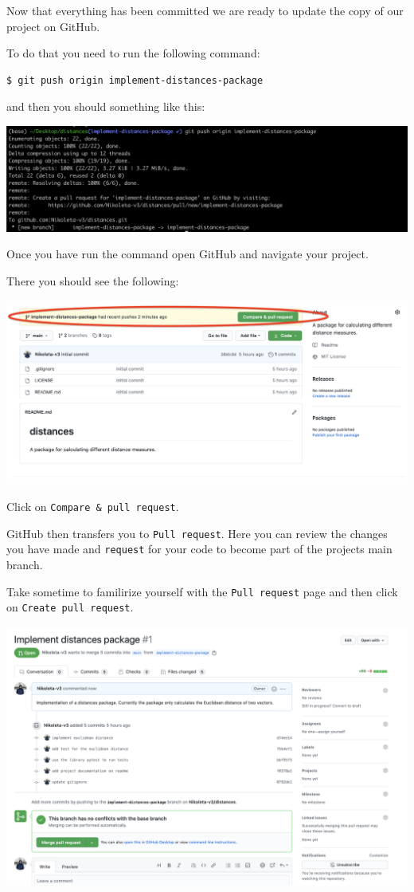 \documentclass[11pt]{article}
\begin{document}
    Now that everything has been committed we are ready to update the copy
of our project on GitHub.

To do that you need to run the following command:

\begin{verbatim}
$ git push origin implement-distances-package
\end{verbatim}

and then you should something like this:

\includegraphics{static/git_push.png}

    Once you have run the command open GitHub and navigate your project.

There you should see the following:

\includegraphics{static/GitHub_new_branch.png}

Click on \texttt{Compare\ \&\ pull\ request}.

GitHub then transfers you to \texttt{Pull\ request}. Here you can review
the changes you have made and \texttt{request} for your code to become
part of the projects main branch.

Take sometime to familirize yourself with the \texttt{Pull\ request}
page and then click on \texttt{Create\ pull\ request}.

\includegraphics{static/pull_request.png}
\end{document}
